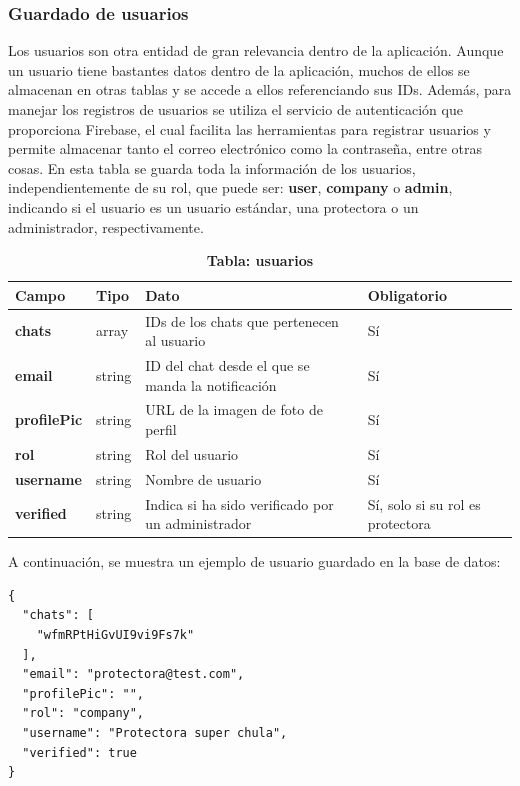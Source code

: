 \documentclass[a4paper, 12pt]{article}
\begin{document}
\subsubsection{Guardado de usuarios}

Los usuarios son otra entidad de gran relevancia dentro de la aplicación. Aunque un usuario tiene bastantes datos dentro de la aplicación, muchos de ellos se almacenan en otras tablas y se accede a ellos referenciando sus IDs. Además, para manejar los registros de usuarios se utiliza el servicio de autenticación que proporciona Firebase, el cual facilita las herramientas para registrar usuarios y permite almacenar tanto el correo electrónico como la contraseña, entre otras cosas. En esta tabla se guarda toda la información de los usuarios, independientemente de su rol, que puede ser: \textbf{user}, \textbf{company} o \textbf{admin}, indicando si el usuario es un usuario estándar, una protectora o un administrador, respectivamente.

\begin{table}[H]
\captionsetup{justification=raggedright,singlelinecheck=false}
\captionsetup{labelformat=empty}
\caption{\textbf{Tabla: usuarios}}
\label{tab:requests}
	\begin{tabular}{|m{3.2cm}|m{2cm}|m{5cm}|m{3cm}|}
	\hline
	\textbf{Campo} & \textbf{Tipo} & \textbf{Dato} & \textbf{Obligatorio} \\ 
	\hline
	\textbf{chats} & array & IDs de los chats que pertenecen al usuario &  Sí \\ 
	\hline
	\textbf{email} & string &  ID del chat desde el que se manda la notificación &  Sí \\ 
	\hline
	\textbf{profilePic} & string & URL de la imagen de foto de perfil & Sí \\ 
	\hline
	\textbf{rol} & string & Rol del usuario & Sí \\ 
	\hline
	\textbf{username} & string & Nombre de usuario & Sí \\ 
	\hline
	\textbf{verified} & string & Indica si ha sido verificado por un administrador & Sí, solo si su rol es protectora \\ 
	\hline
	\end{tabular}
\end{table}



A continuación, se muestra un ejemplo de usuario guardado en la base de datos:

\begin{verbatim}
{
  "chats": [
    "wfmRPtHiGvUI9vi9Fs7k"
  ],
  "email": "protectora@test.com",
  "profilePic": "",
  "rol": "company",
  "username": "Protectora super chula",
  "verified": true
}
\end{verbatim}
\end{document}
